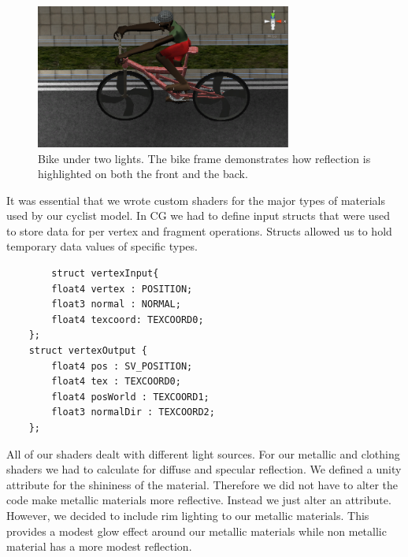 \documentclass{scrartcl}
\begin{document}
	\begin{figure}[h]
   	 \centering
   	 \includegraphics[width=0.75\textwidth]{bike_undertwo_lights.png}
   	 \caption{Bike under two lights.  The bike frame demonstrates how reflection is highlighted on both the front and the back.}
   	 \label{fig:bike_under_lights}
	\end{figure}

	It was essential that we wrote custom shaders for the major types of materials used by our cyclist model.  In CG we had to define input structs that were used to store 	data for per vertex and fragment operations.  Structs allowed us to hold temporary data values of specific types.  
		
        \begin{lstlisting} 
        struct vertexInput{
		float4 vertex : POSITION;
		float3 normal : NORMAL;
		float4 texcoord: TEXCOORD0;
	};
	struct vertexOutput {
		float4 pos : SV_POSITION;
		float4 tex : TEXCOORD0;
		float4 posWorld : TEXCOORD1;
		float3 normalDir : TEXCOORD2;
	};
        \end{lstlisting}		

        All of our shaders dealt with different light sources.  For our metallic and clothing shaders we had to calculate for diffuse and specular reflection.  We defined a unity 		attribute for the shininess of the material. Therefore we did not have to alter the code make metallic materials more reflective.  Instead we just alter an attribute.  		However, we decided to include rim lighting to our metallic materials.  This provides a modest glow effect around our metallic materials while non metallic material has a 	more modest reflection.  
		
\end{document}
